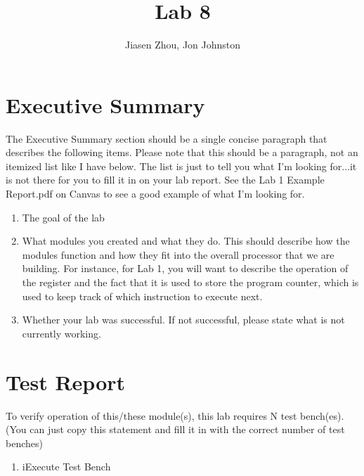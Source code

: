 \documentclass{article}
\author{Jiasen Zhou, Jon Johnston}
\title{Lab 8}
\begin{document}
\maketitle

\section{Executive Summary}
The Executive Summary section should be a single concise paragraph that describes the following items.  Please note that this should be a paragraph, not an itemized list like I have below.  The list is just to tell you what I'm looking for...it is not there for you to fill it in on your lab report.  See the Lab 1 Example Report.pdf on Canvas to see a good example of what I'm looking for.
\begin{enumerate}
	\item The goal of the lab
	\item What modules you created and what they do.  This should describe how the modules function and how they fit into the overall processor that we are building.  For instance, for Lab 1, you will want to describe the operation of the register and the fact that it is used to store the program counter, which is used to keep track of which instruction to execute next.
	\item Whether your lab was successful.  If not successful, please state what is not currently working.
\end{enumerate}	

\section{Test Report}
To verify operation of this/these module(s), this lab requires N test bench(es).  (You can just copy this statement and fill it in with the correct number of test benches)
\begin{enumerate}
	\item iExecute Test Bench
\end{enumerate}

\end{document}
